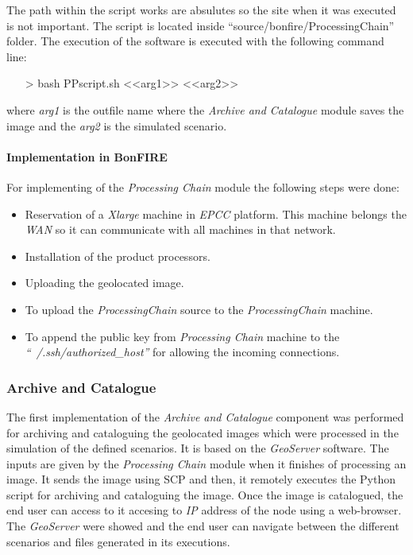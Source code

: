 The path within the script works are absulutes so the site when it was executed
is not important. The script is located inside
``source/bonfire/ProcessingChain'' folder. The execution of the software is executed with the following
command line:
\begin{itemize}
\item[>] bash PPscript.sh <<arg1>> <<arg2>>
\end{itemize}

where \emph{arg1} is the outfile name where the \emph{Archive and Catalogue} module
saves the image and the \emph{arg2} is the simulated scenario.


\paragraph{Implementation in BonFIRE}

For implementing of the \emph{Processing Chain} module the following steps were done:

\begin{itemize}
 \item Reservation of a \emph{Xlarge} machine in \emph{EPCC} \bonfire
   platform. This machine belongs the \bonfire \emph{WAN} so it can communicate
   with all machines in that network. 
 \item Installation of the product processors.
 \item Uploading the geolocated image.
 \item To upload the \emph{ProcessingChain} source to the \emph{ProcessingChain}
   machine.
 \item To append the public key from \emph{Processing Chain} machine to the
   \emph{``~/.ssh/authorized\_host''} for
   allowing the incoming connections.
\end{itemize}

\subsubsection{Archive and Catalogue}

The first implementation of the \emph{Archive and Catalogue} component was
performed for archiving and cataloguing the geolocated images which were
processed in the simulation of the defined scenarios. It is based on the
\emph{GeoServer} software. The inputs are given by the \emph {Processing Chain}
module when it finishes of processing an image. It sends the image using
\ac{SCP} and then, it remotely executes the Python script for archiving and
cataloguing the image. Once the image is catalogued, the end user can access to
it accesing to \emph{IP} address of the node using a web-browser. The
\emph{GeoServer} were showed and the end user can navigate between the different
scenarios and files generated in its executions.

